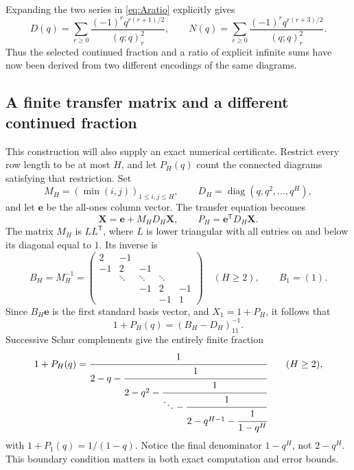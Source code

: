 \documentclass[11pt,letterpaper]{article}
\numberwithin{equation}{section}
\theoremstyle{definition}
\begin{document}
Expanding the two series in \eqref{eq:Aratio} explicitly gives
\[
 D(q)=\sum_{r\ge0}\frac{(-1)^rq^{r(r+1)/2}}{(q;q)_r^2},
 \qquad
 N(q)=\sum_{r\ge0}\frac{(-1)^rq^{r(r+3)/2}}{(q;q)_r^2}.
\]
Thus the selected continued fraction and a ratio of explicit infinite sums
have now been derived from two different encodings of the same diagrams.

\subsection{A finite transfer matrix and a different continued fraction}
This construction will also supply an exact numerical certificate. Restrict
every row length to be at most $H$, and let $P_H(q)$ count the connected
diagrams satisfying that restriction. Set
\[
 M_H=(\min(i,j))_{1\le i,j\le H},\qquad
 D_H=\operatorname{diag}(q,q^2,\ldots,q^H),
\]
and let $\mathbf e$ be the all-ones column vector. The transfer equation
becomes
\begin{equation}
 \mathbf X=\mathbf e+M_HD_H\mathbf X,
 \qquad P_H=\mathbf e^{\mathsf T}D_H\mathbf X.
 \label{eq:finiteTransfer}
\end{equation}
The matrix $M_H$ is $LL^{\mathsf T}$, where $L$ is lower triangular with
all entries on and below its diagonal equal to $1$. Its inverse is
\begin{equation}
 B_H=M_H^{-1}=
 \begin{pmatrix}
 2&-1& & &\\
 -1&2&-1& &\\
 &\ddots&\ddots&\ddots&\\
 &&-1&2&-1\\
 &&&-1&1
 \end{pmatrix}
 \quad(H\ge2),\qquad B_1=(1).
 \label{eq:tridiagonal}
\end{equation}
Since $B_H\mathbf e$ is the first standard basis vector, and
$X_1=1+P_H$, it follows that
\begin{equation}
 1+P_H(q)=(B_H-D_H)^{-1}_{11}.
 \label{eq:inverseentry}
\end{equation}
Successive Schur complements give the entirely finite fraction
\begin{equation}
 1+P_H(q)=\cfrac{1}{2-q-\cfrac{1}{2-q^2-\cfrac{1}{\ddots-
 \cfrac{1}{2-q^{H-1}-\cfrac{1}{1-q^H}}}}}
 \qquad(H\ge2),
 \label{eq:boundedCF}
\end{equation}
with $1+P_1(q)=1/(1-q)$. Notice the final denominator $1-q^H$, not
$2-q^H$. This boundary condition matters in both exact computation and
error bounds.
\end{document}

